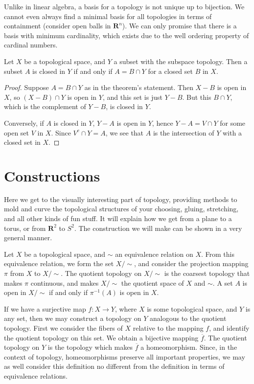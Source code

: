Unlike in linear algebra, a basis for a topology is not unique up to bijection. We cannot even always find a minimal basis for all topologies in terms of containment (consider open balls in $\mathbf{R}^n$). We can only promise that there is a basis with minimum cardinality, which exists due to the well ordering property of cardinal numbers.

\begin{theorem}
    Let $X$ be a topological space, and $Y$ a subset with the subspace topology. Then a subset $A$ is closed in $Y$ if and only if $A = B \cap Y$ for a closed set $B$ in $X$.
\end{theorem}
\begin{proof}
    Suppose $A = B \cap Y$ as in the theorem's statement. Then $X - B$ is open in $X$, so $(X - B) \cap Y$ is open in $Y$, and this set is just $Y - B$. But this $B \cap Y$, which is the complement of $Y - B$, is closed in $Y$.

    Conversely, if $A$ is closed in $Y$, $Y - A$ is open in $Y$, hence $Y - A = V \cap Y$ for some open set $V$ in $X$. Since $V^c \cap Y = A$, we see that $A$ is the intersection of $Y$ with a closed set in $X$.
\end{proof}

\chapter{Constructions}

Here we get to the visually interesting part of topology, providing methods to mold and curve the topological structures of your choosing, gluing, stretching, and all other kinds of fun stuff. It will explain how we get from a plane to a torus, or from $\mathbf{R}^2$ to $S^2$. The construction we will make can be shown in a very general manner.

\begin{definition}
    Let $X$ be a topological space, and $\sim$ an equivalence relation on $X$. From this equivalence relation, we form the set $X/\sim$, and consider the projection mapping $\pi$ from $X$ to $X/\sim$. The quotient topology on $X/\sim$ is the coarsest topology that makes $\pi$ continuous, and makes $X/\sim$ the quotient space of $X$ and $\sim$. A set $A$ is open in $X/\sim$ if and only if $\pi^{-1}(A)$ is open in $X$.
\end{definition}

If we have a surjective map $f:X \to Y$, where $X$ is some topological space, and $Y$ is any set, then we may construct a topology on $Y$ analogous to the quotient topology. First we consider the fibers of $X$ relative to the mapping $f$, and identify the quotient topology on this set. We obtain a bijective mapping $\overline{f}$. The quotient topology on $Y$ is the topology which makes $\overline{f}$ a homeomorphism. Since, in the context of topology, homeomorphisms preserve all important properties, we may as well consider this definition no different from the definition in terms of equivalence relations.

